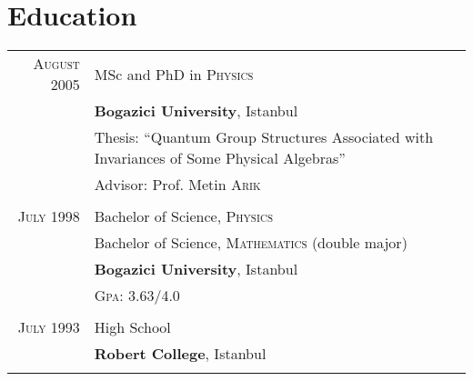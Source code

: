 \documentclass[a4paper,10pt]{article}
\begin{document}
\section{Education}
\begin{longtable}{r|p{11cm}}
  \textsc{August} 2005  & MSc and PhD in \textsc{Physics} \\
                        & \textbf{Bogazici University}, Istanbul\\
                        & Thesis: ``Quantum Group Structures Associated with Invariances of Some Physical Algebras'' \\
                        & \small Advisor: Prof. Metin \textsc{Arik}\\
  \multicolumn{2}{c}{} \\

  \textsc{July} 1998    & Bachelor of Science, \textsc{Physics} \\
                        & Bachelor of Science, \textsc{Mathematics} (double major) \\
                        & \normalsize\textbf{Bogazici University}, Istanbul \\
                        & \normalsize \textsc{Gpa}: 3.63/4.0 \\
  \multicolumn{2}{c}{} \\

  \textsc{July} 1993    & High School \\
                        & \normalsize\textbf{Robert College}, Istanbul \\
  \multicolumn{2}{c}{} \\
\end{longtable}

\newpage
\end{document}
